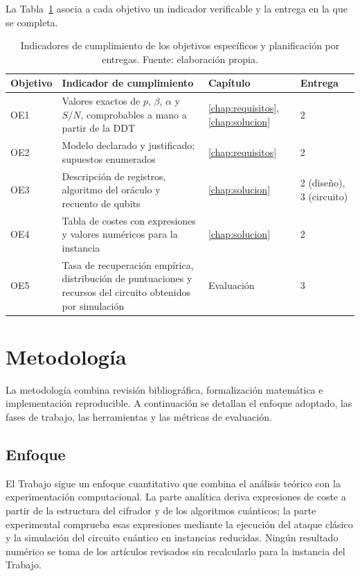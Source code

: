 La Tabla~\ref{tab:objetivos} asocia a cada objetivo un indicador verificable y la entrega en la que se completa.

\begin{table}[H]
\centering
\small
\begin{tabular}{p{} p{} p{} p{}}
\hline\hline
Objetivo & Indicador de cumplimiento & Capítulo & Entrega \\
\hline
OE1 & Valores exactos de \(p\), \(\beta\), \(\alpha\) y \(S/N\), comprobables a mano a partir de la DDT & \ref{chap:requisitos}, \ref{chap:solucion} & 2 \\
OE2 & Modelo declarado y justificado; supuestos enumerados & \ref{chap:requisitos} & 2 \\
OE3 & Descripción de registros, algoritmo del oráculo y recuento de qubits & \ref{chap:solucion} & 2 (diseño), 3 (circuito) \\
OE4 & Tabla de costes con expresiones y valores numéricos para la instancia & \ref{chap:solucion} & 2 \\
OE5 & Tasa de recuperación empírica, distribución de puntuaciones y recursos del circuito obtenidos por simulación & Evaluación & 3 \\
\hline
\end{tabular}
\caption[Indicadores de los objetivos específicos]{Indicadores de cumplimiento de los objetivos específicos y planificación por entregas. Fuente: elaboración propia.}
\label{tab:objetivos}
\end{table}

\section{Metodología}

La metodología combina revisión bibliográfica, formalización matemática e implementación reproducible. A continuación se detallan el enfoque adoptado, las fases de trabajo, las herramientas y las métricas de evaluación.

\subsection{Enfoque}

El Trabajo sigue un enfoque cuantitativo que combina el análisis teórico con la experimentación computacional. La parte analítica deriva expresiones de coste a partir de la estructura del cifrador y de los algoritmos cuánticos; la parte experimental comprueba esas expresiones mediante la ejecución del ataque clásico y la simulación del circuito cuántico en instancias reducidas. Ningún resultado numérico se toma de los artículos revisados sin recalcularlo para la instancia del Trabajo.


